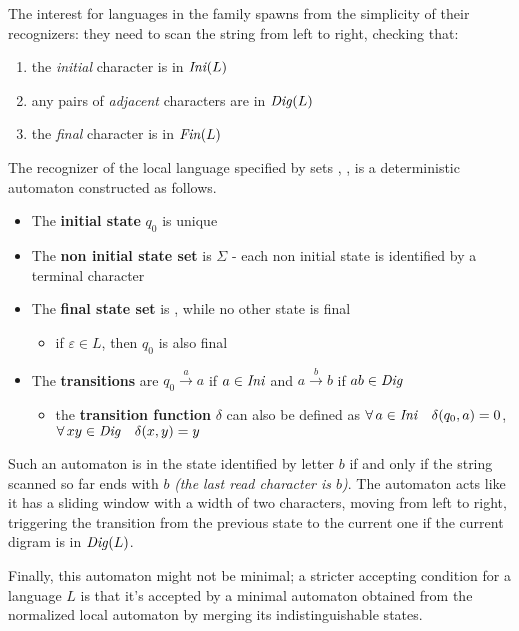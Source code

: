 \documentclass[english]{article}
\begin{document}
The interest for languages in the \LOC family spawns from the simplicity of their recognizers:
they need to scan the string from left to right, checking that:

\begin{enumerate}
  \item the \textit{initial} character is in \(\textit{Ini}\hspace{0.1ex}(L)\)
  \item any pairs of \textit{adjacent} characters are in \(\textit{Dig}\hspace{0.1ex}(L)\)
  \item the \textit{final} character is in \(\textit{Fin}\hspace{0.1ex}(L)\)
\end{enumerate}

\bigskip
The recognizer of the local language specified by sets \Ini, \Fin, \Dig is a deterministic automaton constructed as follows.

\begin{itemize}
  \item The \textbf{initial state} \(q_0\) is unique
  \item The \textbf{non initial state set} is \(\Sigma\) - each non initial state is identified by a terminal character
  \item The \textbf{final state set} is \Fin, while no other state is final
        \begin{itemize}[label=\(\rightarrow\)]
          \item if \(\varepsilon \in L\), then \(q_0\) is also final
        \end{itemize}
  \item The \textbf{transitions} are \(q_0 \xrightarrow{a} a\) if \(a \in \textit{Ini}\hspace{0.1ex}\) and \(a \xrightarrow{b} b\) if \(ab \in \textit{Dig}\hspace{0.1ex}\)
        \begin{itemize}[label=\(\rightarrow\)]
          \item the \textbf{transition function} \(\delta\) can also be defined as \(\forall \, a \in \textit{Ini}\hspace{0.1ex} \quad \delta(q_0, a) = 0\), \(\forall \, xy \in \textit{Dig}\hspace{0.1ex} \quad \delta(x, y) = y\)
        \end{itemize}
\end{itemize}

Such an automaton is in the state identified by letter \(b\) if and only if the string scanned so far ends with \(b\) \textit{(the last read character is \(b\))}.
The automaton acts like it has a sliding window with a width of two characters, moving from left to right, triggering the transition from the previous state to the current one if the current digram is in \(\textit{Dig}\hspace{0.1ex}(L)\).

Finally, this automaton might not be minimal;
a stricter accepting condition for a language \(L\) is that it's accepted by a minimal automaton obtained from the normalized local automaton by merging its indistinguishable states.
\end{document}
